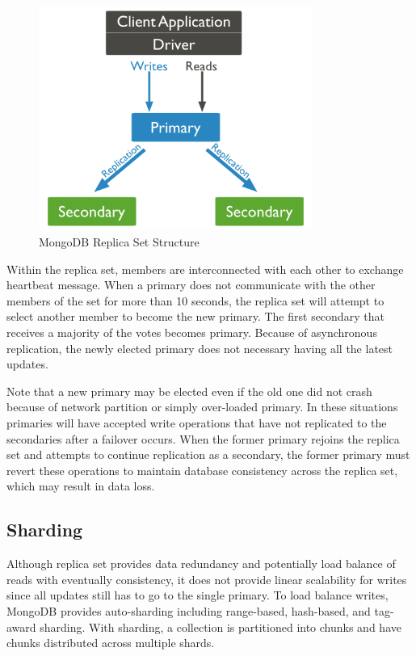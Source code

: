 \documentclass[11pt]{book}
\begin{document}
\begin{figure}[t]
\includegraphics[width=0.8\textwidth]{images/mongodb-replica-set.png}
\centering
\caption{MongoDB Replica Set Structure}
\end{figure}

Within the replica set, members are interconnected with each other to exchange heartbeat message. When a primary does not communicate with the other members of the set for more than 10 seconds, the replica set will attempt to select another member to become the new primary. The first secondary that receives a majority of the votes becomes primary. Because of asynchronous replication, the newly elected primary does not necessary having all the latest updates.

Note that a new primary may be elected even if the old one did not crash because of network partition or simply over-loaded primary. In these situations primaries will have accepted write operations that have not replicated to the secondaries after a failover occurs. When the former primary rejoins the replica set and attempts to continue replication as a secondary, the former primary must revert these operations to maintain database consistency across the replica set, which may result in data loss.

\subsection{Sharding}

Although replica set provides data redundancy and potentially load balance of reads with eventually consistency, it does not provide linear scalability for writes since all updates still has to go to the single primary. To load balance writes, MongoDB provides auto-sharding including range-based, hash-based, and tag-award sharding. With sharding, a collection is partitioned into chunks and have chunks distributed across multiple shards.
\end{document}
